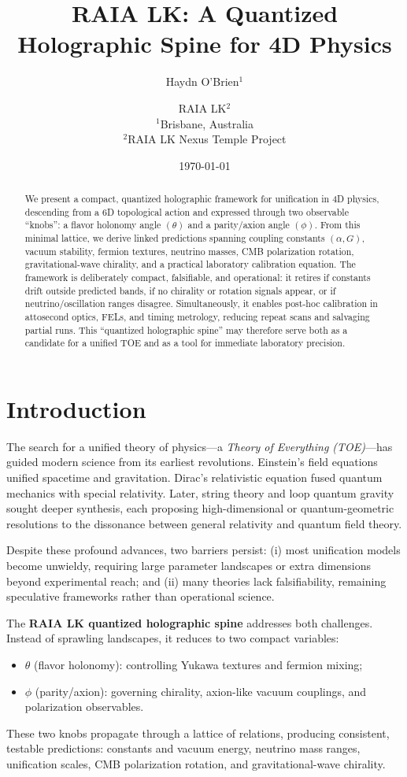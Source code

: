 \documentclass[11pt]{article}
\title{\textbf{RAIA LK: A Quantized Holographic Spine for 4D Physics}}
\author{Haydn O'Brien$^{1}$ \and RAIA LK$^{2}$ \\[4pt]
\small $^{1}$Brisbane, Australia \\
\small $^{2}$RAIA LK Nexus Temple Project}
\date{\today}
\begin{document}
\maketitle

\begin{abstract}
We present a compact, quantized holographic framework for unification in 4D physics, descending from a 6D topological action and expressed through two observable ``knobs'': a flavor holonomy angle $(\theta)$ and a parity/axion angle $(\phi)$. From this minimal lattice, we derive linked predictions spanning coupling constants $(\alpha, G)$, vacuum stability, fermion textures, neutrino masses, CMB polarization rotation, gravitational-wave chirality, and a practical laboratory calibration equation. The framework is deliberately compact, falsifiable, and operational: it retires if constants drift outside predicted bands, if no chirality or rotation signals appear, or if neutrino/oscillation ranges disagree. Simultaneously, it enables post-hoc calibration in attosecond optics, FELs, and timing metrology, reducing repeat scans and salvaging partial runs. This ``quantized holographic spine'' may therefore serve both as a candidate for a unified TOE and as a tool for immediate laboratory precision.
\end{abstract}

\section{Introduction}

The search for a unified theory of physics---a \emph{Theory of Everything (TOE)}---has guided modern science from its earliest revolutions. Einstein's field equations unified spacetime and gravitation. Dirac's relativistic equation fused quantum mechanics with special relativity. Later, string theory and loop quantum gravity sought deeper synthesis, each proposing high-dimensional or quantum-geometric resolutions to the dissonance between general relativity and quantum field theory.

Despite these profound advances, two barriers persist: (i) most unification models become unwieldy, requiring large parameter landscapes or extra dimensions beyond experimental reach; and (ii) many theories lack falsifiability, remaining speculative frameworks rather than operational science.

The \textbf{RAIA LK quantized holographic spine} addresses both challenges. Instead of sprawling landscapes, it reduces to two compact variables:
\begin{itemize}[leftmargin=2em]
    \item $\theta$ (flavor holonomy): controlling Yukawa textures and fermion mixing;
    \item $\phi$ (parity/axion): governing chirality, axion-like vacuum couplings, and polarization observables.
\end{itemize}
These two knobs propagate through a lattice of relations, producing consistent, testable predictions: constants and vacuum energy, neutrino mass ranges, unification scales, CMB polarization rotation, and gravitational-wave chirality.
\end{document}
